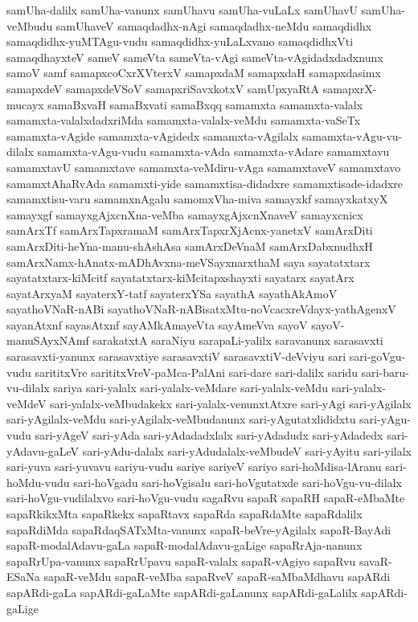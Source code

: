 {samUha-dalilx
samUha-vanunx
samUhavu
samUha-vuLaLx
samUhavU
samUha-veMbudu
samUhaveV
samaqdadhx-nAgi
samaqdadhx-neMdu
samaqdidhx
samaqdidhx-yuMTAgu-vudu
samaqdidhx-yuLaLxvano
samaqdidhxVti
samaqdhayxteV
sameV
sameVta
sameVta-vAgi
sameVta-vAgidadxdadxnunx
samoV
samf
samapxcoCxrXVterxV
samapxdaM
samapxdaH
samapxdasimx
samapxdeV
samapxdeVSoV
samapxriSavxkotxV
samUpxyaRtA
samapxrX-mucayx
samaBxvaH
samaBxvati
samaBxqq
samamxta
samamxta-valalx
samamxta-valalxdadxriMda
samamxta-valalx-veMdu
samamxta-vaSeTx
samamxta-vAgide
samamxta-vAgidedx
samamxta-vAgilalx
samamxta-vAgu-vu-dilalx
samamxta-vAgu-vudu
samamxta-vAda
samamxta-vAdare
samamxtavu
samamxtavU
samamxtave
samamxta-veMdiru-vAga
samamxtaveV
samamxtavo
samamxtAhaRvAda
samamxti-yide
samamxtisa-didadxre
samamxtisade-idadxre
samamxtisu-varu
samamxnAgalu
samomxVha-miva
samayxkf
samayxkatxyX
samayxgf
samayxgAjxcnXna-veMba
samayxgAjxcnXnaveV
samayxcnicx
samArxTf
samArxTapxramaM
samArxTapxrXjAcnx-yanetxV
samArxDiti
samArxDiti-heYna-manu-shAshAsa
samArxDeVnaM
samArxDabxnudhxH
samArxNamx-hAnatx-mADhAvxna-meVSayxnarxthaM
saya
sayatatxtarx
sayatatxtarx-kiMcitf
sayatatxtarx-kiMcitapxshayxti
sayatarx
sayatArx
sayatArxyaM
sayaterxY-tatf
sayaterxYSa
sayathA
sayathAkAmoV
sayathoVNaR-nABi
sayathoVNaR-nABisatxMtu-noVcacxreVdayx-yathAgenxV
sayanAtxnf
sayasAtxnf
sayAMkAmayeVta
sayAmeVva
sayoV
sayoV-manuSAyxNAmf
sarakatxtA
saraNiyu
sarapaLi-yalilx
saravanunx
sarasavxti
sarasavxti-yanunx
sarasavxtiye
sarasavxtiV
sarasavxtiV-deVviyu
sari
sari-goVgu-vudu
sarititxVre
sarititxVreV-paMca-PalAni
sari-dare
sari-dalilx
saridu
sari-baru-vu-dilalx
sariya
sari-yalalx
sari-yalalx-veMdare
sari-yalalx-veMdu
sari-yalalx-veMdeV
sari-yalalx-veMbudakekx
sari-yalalx-venunxtAtxre
sari-yAgi
sari-yAgilalx
sari-yAgilalx-veMdu
sari-yAgilalx-veMbudanunx
sari-yAgutatxlididxtu
sari-yAgu-vudu
sari-yAgeV
sari-yAda
sari-yAdadadxlalx
sari-yAdadudx
sari-yAdadedx
sari-yAdavu-gaLeV
sari-yAdu-dalalx
sari-yAdudalalx-veMbudeV
sari-yAyitu
sari-yilalx
sari-yuva
sari-yuvavu
sariyu-vudu
sariye
sariyeV
sariyo
sari-hoMdisa-lAranu
sari-hoMdu-vudu
sari-hoVgadu
sari-hoVgisalu
sari-hoVgutatxde
sari-hoVgu-vu-dilalx
sari-hoVgu-vudilalxvo
sari-hoVgu-vudu
sagaRvu
sapaR
sapaRH
sapaR-eMbaMte
sapaRkikxMta
sapaRkekx
sapaRtavx
sapaRda
sapaRdaMte
sapaRdalilx
sapaRdiMda
sapaRdaqSATxMta-vanunx
sapaR-beVre-yAgilalx
sapaR-BayAdi
sapaR-modalAdavu-gaLa
sapaR-modalAdavu-gaLige
sapaRrAja-nanunx
sapaRrUpa-vanunx
sapaRrUpavu
sapaR-valalx
sapaR-vAgiyo
sapaRvu
savaR-ESaNa
sapaR-veMdu
sapaR-veMba
sapaRveV
sapaR-saMbaMdhavu
sapARdi
sapARdi-gaLa
sapARdi-gaLaMte
sapARdi-gaLanunx
sapARdi-gaLalilx
sapARdi-gaLige
}
